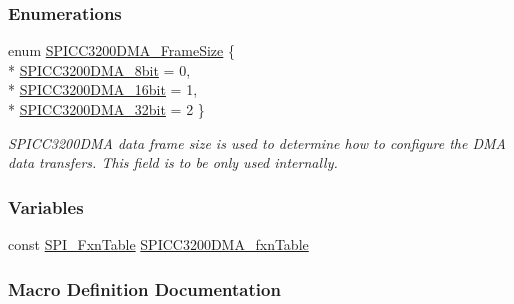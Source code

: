 \subsubsection*{Enumerations}
\begin{DoxyCompactItemize}
\item 
enum \hyperlink{_s_p_i_c_c3200_d_m_a_8h_a886c3ca11a73823e4f3ab5eefc0fbebb}{S\-P\-I\-C\-C3200\-D\-M\-A\-\_\-\-Frame\-Size} \{ \\*
\hyperlink{_s_p_i_c_c3200_d_m_a_8h_a886c3ca11a73823e4f3ab5eefc0fbebba681b4f53a3f33707b0ca9138d8a88a4b}{S\-P\-I\-C\-C3200\-D\-M\-A\-\_\-8bit} = 0, 
\\*
\hyperlink{_s_p_i_c_c3200_d_m_a_8h_a886c3ca11a73823e4f3ab5eefc0fbebba4d692c2c948d075ba729709f430cf739}{S\-P\-I\-C\-C3200\-D\-M\-A\-\_\-16bit} = 1, 
\\*
\hyperlink{_s_p_i_c_c3200_d_m_a_8h_a886c3ca11a73823e4f3ab5eefc0fbebba228f6056a9f34595480faab1f2ed8123}{S\-P\-I\-C\-C3200\-D\-M\-A\-\_\-32bit} = 2
 \}
\begin{DoxyCompactList}\small\item\em S\-P\-I\-C\-C3200\-D\-M\-A data frame size is used to determine how to configure the D\-M\-A data transfers. This field is to be only used internally. \end{DoxyCompactList}\end{DoxyCompactItemize}
\subsubsection*{Variables}
\begin{DoxyCompactItemize}
\item 
const \hyperlink{struct_s_p_i___fxn_table}{S\-P\-I\-\_\-\-Fxn\-Table} \hyperlink{_s_p_i_c_c3200_d_m_a_8h_ae0c3b60cf8063a900d504e232dc18c3c}{S\-P\-I\-C\-C3200\-D\-M\-A\-\_\-fxn\-Table}
\end{DoxyCompactItemize}


\subsubsection{Macro Definition Documentation}

